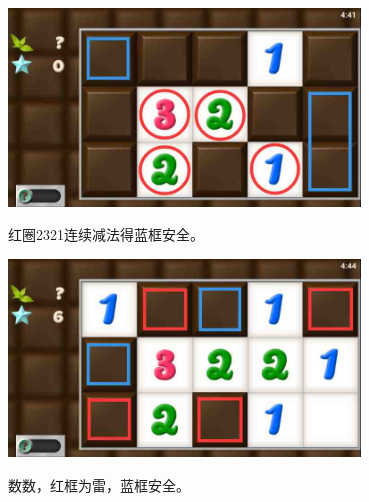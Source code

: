 \subsection{} %
\begin{center}
    \includegraphics[width=0.7\textwidth]{puzzlelow/71-1.jpg}
\end{center}
红圈2321连续减法得蓝框安全。
\begin{center}
    \includegraphics[width=0.7\textwidth]{puzzlelow/71-2.jpg}
\end{center}
数数，红框为雷，蓝框安全。

